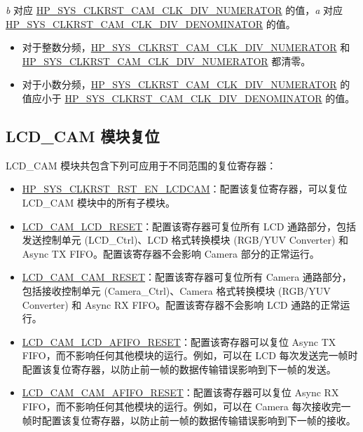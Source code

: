 \documentclass[main\_\_CN.tex]{subfiles}
\begin{document}
\textit{b} 对应 \hyperref[fielddesc:HPSYSCLKRSTCAMCLKDIVNUMERATOR]{HP\_SYS\_CLKRST\_CAM\_CLK\_DIV\_NUMERATOR} 的值，\textit{a} 对应 \hyperref[fielddesc:HPSYSCLKRSTCAMCLKDIVDENOMINATOR]{HP\_SYS\_CLKRST\_CAM\_CLK\_DIV\_DENOMINATOR} 的值。
\begin{itemize}
    \item 对于整数分频，\hyperref[fielddesc:HPSYSCLKRSTCAMCLKDIVNUMERATOR]{HP\_SYS\_CLKRST\_CAM\_CLK\_DIV\_NUMERATOR} 和 \hyperref[fielddesc:HPSYSCLKRSTCAMCLKDIVNUMERATOR]{HP\_SYS\_CLKRST\_CAM\_CLK\_DIV\_NUMERATOR} 都清零。
    \item 对于小数分频，\hyperref[fielddesc:HPSYSCLKRSTCAMCLKDIVNUMERATOR]{HP\_SYS\_CLKRST\_CAM\_CLK\_DIV\_NUMERATOR} 的值应小于 \hyperref[fielddesc:HPSYSCLKRSTCAMCLKDIVDENOMINATOR]{HP\_SYS\_CLKRST\_CAM\_CLK\_DIV\_DENOMINATOR} 的值。
\end{itemize}

\subsection{LCD\_CAM 模块复位} \label{sec:lcdcam_reset}

LCD\_CAM 模块共包含下列可应用于不同范围的复位寄存器：

\begin{itemize}
\item \hyperref[fielddesc:HPSYSCLKRSTRSTENLCDCAM]{HP\_SYS\_CLKRST\_RST\_EN\_LCDCAM}：配置该复位寄存器，可以复位 LCD\_CAM 模块中的所有子模块。
\item \hyperref[fielddesc:LCDCAMLCDRESET]{LCD\_CAM\_LCD\_RESET}：配置该寄存器可复位所有 LCD 通路部分，包括发送控制单元 (LCD\_Ctrl)、LCD 格式转换模块 (RGB/YUV Converter) 和 Async TX FIFO。配置该寄存器不会影响 Camera 部分的正常运行。
\item \hyperref[fielddesc:LCDCAMCAMRESET]{LCD\_CAM\_CAM\_RESET}：配置该寄存器可复位所有 Camera 通路部分，包括接收控制单元 (Camera\_Ctrl)、Camera 格式转换模块 (RGB/YUV Converter) 和 Async RX FIFO。配置该寄存器不会影响 LCD 通路的正常运行。
\item \hyperref[fielddesc:LCDCAMLCDAFIFORESET]{LCD\_CAM\_LCD\_AFIFO\_RESET}：配置该寄存器可以复位 Async TX FIFO，而不影响任何其他模块的运行。例如，可以在 LCD 每次发送完一帧时配置该复位寄存器，以防止前一帧的数据传输错误影响到下一帧的发送。
\item \hyperref[fielddesc:LCDCAMCAMAFIFORESET]{LCD\_CAM\_CAM\_AFIFO\_RESET}：配置该寄存器可以复位 Async RX FIFO，而不影响任何其他模块的运行。例如，可以在 Camera 每次接收完一帧时配置该复位寄存器，以防止前一帧的数据传输错误影响到下一帧的接收。
\end{itemize}
\end{document}
